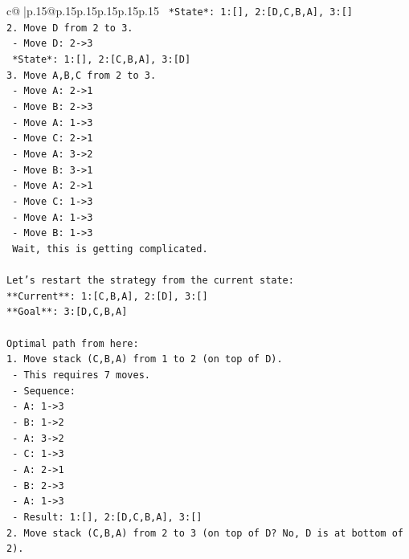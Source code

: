 \documentclass{article}
\begin{document}
{\begin{supertabular}{c@{$\;$}|p{.15\linewidth}@{}p{.15\linewidth}p{.15\linewidth}p{.15\linewidth}p{.15\linewidth}p{.15\linewidth}}
{{{\texttt{   *State*: 1:{[}{]}, 2:{[}D,C,B,A{]}, 3:{[}{]}} \\
\texttt{2. Move D from 2 to 3.} \\
\texttt{   {-} Move D: 2{-}>3} \\
\texttt{   *State*: 1:{[}{]}, 2:{[}C,B,A{]}, 3:{[}D{]}} \\
\texttt{3. Move A,B,C from 2 to 3.} \\
\texttt{   {-} Move A: 2{-}>1} \\
\texttt{   {-} Move B: 2{-}>3} \\
\texttt{   {-} Move A: 1{-}>3} \\
\texttt{   {-} Move C: 2{-}>1} \\
\texttt{   {-} Move A: 3{-}>2} \\
\texttt{   {-} Move B: 3{-}>1} \\
\texttt{   {-} Move A: 2{-}>1} \\
\texttt{   {-} Move C: 1{-}>3} \\
\texttt{   {-} Move A: 1{-}>3} \\
\texttt{   {-} Move B: 1{-}>3} \\
\texttt{   Wait, this is getting complicated.} \\
\\ 
\texttt{Let's restart the strategy from the current state:} \\
\texttt{**Current**: 1:{[}C,B,A{]}, 2:{[}D{]}, 3:{[}{]}} \\
\texttt{**Goal**: 3:{[}D,C,B,A{]}} \\
\\ 
\texttt{Optimal path from here:} \\
\texttt{1. Move stack (C,B,A) from 1 to 2 (on top of D).} \\
\texttt{   {-} This requires 7 moves.} \\
\texttt{   {-} Sequence:} \\
\texttt{     {-} A: 1{-}>3} \\
\texttt{     {-} B: 1{-}>2} \\
\texttt{     {-} A: 3{-}>2} \\
\texttt{     {-} C: 1{-}>3} \\
\texttt{     {-} A: 2{-}>1} \\
\texttt{     {-} B: 2{-}>3} \\
\texttt{     {-} A: 1{-}>3} \\
\texttt{   {-} Result: 1:{[}{]}, 2:{[}D,C,B,A{]}, 3:{[}{]}} \\
\texttt{2. Move stack (C,B,A) from 2 to 3 (on top of D? No, D is at bottom of 2).} \\
}}}
\end{supertabular}}
\end{document}
